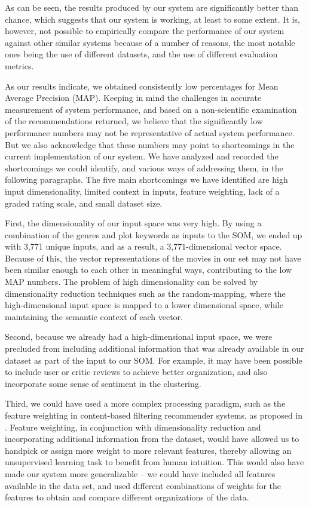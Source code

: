 \documentclass[conference]{IEEEtran}
\begin{document}
As can be seen, the results produced by our system are significantly better than chance, which suggests that our system is working, at least to some extent. It is, however, not possible to empirically compare the performance of our system against other similar systems because of a number of reasons, the most notable ones being the use of different datasets, and the use of different evaluation metrics. 

As our results indicate, we obtained consistently low percentages for Mean Average Precision (MAP). Keeping in mind the challenges in accurate measurement of system performance, and based on a non-scientific examination of the recommendations returned, we believe that the significantly low performance numbers may not be representative of actual system performance. But we also acknowledge that these numbers may point to shortcomings in the current implementation of our system. We have analyzed and recorded the shortcomings we could identify, and various ways of addressing them, in the following paragraphs. The five main shortcomings we have identified are high input dimensionality, limited context in inputs, feature weighting, lack of a graded rating scale, and small dataset size.

First, the dimensionality of our input space was very high. By using a combination of the genres and plot keywords as inputs to the SOM, we ended up with 3,771 unique inputs, and as a result, a 3,771-dimensional vector space. Because of this, the vector representations of the movies in our set may not have been similar enough to each other in meaningful ways, contributing to the low MAP numbers. The problem of high dimensionality can be solved by dimensionality reduction techniques such as the random-mapping, where the high-dimensional input space is mapped to a lower dimensional space, while maintaining the semantic context of each vector.

Second, because we already had a high-dimensional input space, we were precluded from including additional information that was already available in our dataset as part of the input to our SOM. For example, it may have been possible to include user or critic reviews to achieve better organization, and also incorporate some sense of sentiment in the clustering.

Third, we could have used a more complex processing paradigm, such as the feature weighting in content-based filtering recommender systems, as proposed in \cite{debnath2008feature}. Feature weighting, in conjunction with dimensionality reduction and incorporating additional information from the dataset, would have allowed us to handpick or assign more weight to more relevant features, thereby allowing an unsupervised learning task to benefit from human intuition. This would also have made our system more generalizable – we could have included all features available in the data set, and used different combinations of weights for the features to obtain and compare different organizations of the data.
\end{document}
